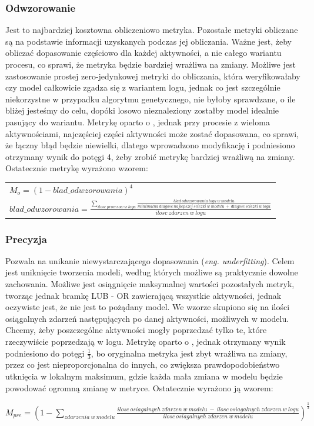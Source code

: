 \subsubsection{Odwzorowanie} 
Jest to najbardziej kosztowna obliczeniowo metryka. Pozostałe metryki obliczane są na podstawie informacji uzyskanych podczas jej obliczania. Ważne jest, żeby obliczać dopasowanie częściowo dla każdej aktywności, a nie całego wariantu procesu, co sprawi, że metryka będzie bardziej wrażliwa na zmiany. Możliwe jest zastosowanie prostej zero-jedynkowej metryki do obliczania, która weryfikowałaby czy model całkowicie zgadza się z wariantem logu, jednak co jest szczególnie niekorzystne w przypadku algorytmu genetycznego, nie byłoby sprawdzane, o ile bliżej jesteśmy do celu, dopóki losowo nieznaleziony zostałby model idealnie pasujący do wariantu. Metrykę oparto o \cite{metric-calculation}, jednak przy procesie z wieloma aktywnościami, najczęściej części aktywności może zostać dopasowana, co sprawi, że łączny błąd będzie niewielki, dlatego wprowadzono modyfikację i podniesiono otrzymany wynik do potęgi 4, żeby zrobić metrykę bardziej wrażliwą na zmiany. Ostatecznie metrykę wyrażono wzorem:
\begin{center}
\begin{tabular}{l}
$M_o = (1 - blad\_odwzorowania)^4$ \\
$blad\_odwzorowania = \frac{\sum_{ilosc\ procesow\ w\ logu} \frac{blad\ odwzorowania\ logu\ w\ modelu}{minimalna\ długosc\ najlepszej\ sciezki\ w\ modelu\ +\ długosc\ sciezki\ w\ logu}}{ilosc\ zdarzen \ w\ logu}$
\end{tabular}
\end{center}
\subsubsection{Precyzja} 
Pozwala na unikanie niewystarczającego dopasowania (\textit{eng. underfitting}). Celem jest uniknięcie tworzenia modeli, według których możliwe są praktycznie dowolne zachowania. Możliwe jest osiągnięcie maksymalnej wartości pozostałych metryk, tworząc jednak bramkę LUB - OR zawierającą wszystkie aktywności, jednak oczywiste jest, że nie jest to pożądany model. We wzorze skupiono się na ilości osiągalnych zdarzeń następujących po danej aktywności, możliwych w modelu. Chcemy, żeby poszczególne aktywności mogły poprzedzać tylko te, które rzeczywiście poprzedzają w logu. Metrykę oparto o \cite{precision-calculation}, jednak otrzymany wynik podniesiono do potęgi $\frac{1}{3}$, bo oryginalna metryka jest zbyt wrażliwa na zmiany, przez co jest nieproporcjonalna do innych, co zwiększa prawdopodobieństwo utknięcia w lokalnym maksimum, gdzie każda mała zmiana w modelu będzie powodować ogromną zmianę w metryce. Ostatecznie wyrażono ją wzorem:
\begin{center}
$M_{pre} = (1 - \sum_{zdarzenia\ w\ modelu} \frac{ilosc\ osiagalnych\ zdarzen\ w\ modelu\ -\ ilosc\ osiagalnych\ zdarzen\ w\ logu}{ilosc\ osiagalnych\ zdarzen\ w\ modelu})^{\frac{1}{3}} $
\end{center}
